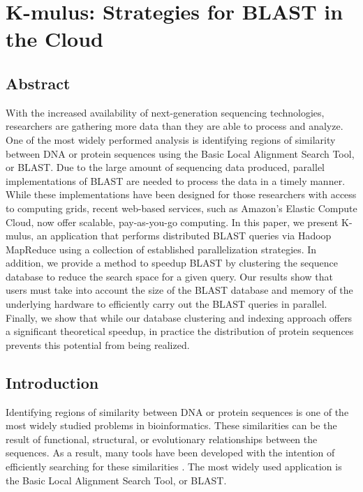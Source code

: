 \section{K-mulus: Strategies for BLAST in the Cloud}
\subsection{Abstract}
With the increased availability of next-generation sequencing technologies, researchers are gathering more data than they are able to process and analyze. One of the most widely performed analysis is identifying regions of similarity between DNA or protein sequences using the Basic Local Alignment Search Tool, or BLAST. Due to the large amount of sequencing data produced, parallel implementations of BLAST are needed to process the data in a timely manner.  While these implementations have been designed for those researchers with access to computing grids, recent web-based services, such as Amazon's Elastic Compute Cloud, now offer scalable, pay-as-you-go computing.  In this paper, we present K-mulus, an application that performs distributed BLAST queries via Hadoop MapReduce using a collection of established parallelization strategies. In addition, we provide a method to speedup BLAST by clustering the sequence database to reduce the search space for a given query.  Our results show that users must take into account the size of the BLAST database and memory of the underlying hardware to efficiently carry out the BLAST queries in parallel.  Finally, we show that while our database clustering and indexing approach offers a significant theoretical speedup, in practice the distribution of protein sequences prevents this potential from being realized.

%
%
\subsection{Introduction}
Identifying regions of similarity between DNA or protein sequences is one of the most widely studied problems in bioinformatics. These similarities can be the result of functional, structural, or evolutionary relationships between the sequences. As a result, many tools have been developed with the intention of efficiently searching for these similarities \cite{altschul1990basic,eddy2009new,kent2002blat}. The most widely used application is the Basic Local Alignment Search Tool, or BLAST\cite{altschul1990basic}.

